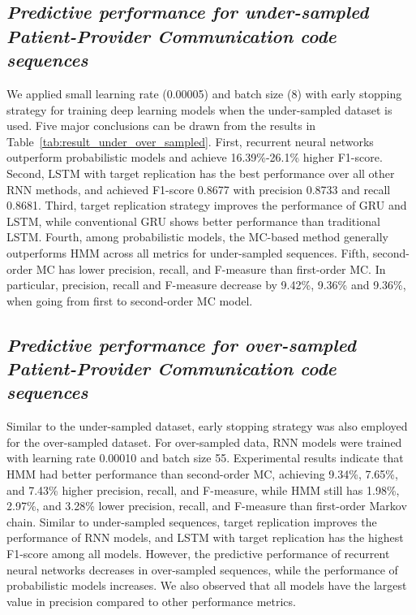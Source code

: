 \documentclass{amia_summit_2018}
\begin{document}
\subsection*{\textit{Predictive performance for under-sampled Patient-Provider Communication code sequences}}
We applied small learning rate (0.00005) and batch size (8) with early stopping strategy for training deep learning models when the under-sampled dataset is used. Five major conclusions can be drawn
from the results in Table~\ref{tab:result_under_over_sampled}. First, recurrent neural networks outperform probabilistic models and achieve 16.39\%-26.1\% higher F1-score. Second, LSTM with
target replication has the best performance over all other RNN methods, and achieved F1-score 0.8677 with precision 0.8733 and recall 0.8681. Third, target replication strategy improves the
performance of GRU and LSTM, while conventional GRU shows better performance than traditional LSTM. Fourth, among probabilistic models, the MC-based method generally outperforms HMM across all metrics
for under-sampled sequences. Fifth, second-order MC has lower precision, recall, and F-measure than first-order MC. In particular, precision, recall and F-measure decrease by 9.42\%, 9.36\% and 
9.36\%, when going from first to second-order MC model.

\subsection*{\textit{Predictive performance for over-sampled Patient-Provider Communication code sequences}}
Similar to the under-sampled dataset, early stopping strategy was also employed for the over-sampled dataset. For over-sampled data, RNN models were trained with learning rate 0.00010 and batch size
55. Experimental results indicate that HMM had better performance than second-order MC, achieving 9.34\%, 7.65\%, and 7.43\% higher precision, recall, and F-measure, while HMM still has 1.98\%,
2.97\%, and 3.28\% lower precision, recall, and F-measure than first-order Markov chain. Similar to under-sampled sequences, target replication improves the performance of RNN models, and LSTM with
target replication has the highest F1-score among all models. However, the predictive performance of recurrent neural networks decreases in over-sampled sequences, while the performance of
probabilistic models increases. We also observed that all models have the largest value in precision compared to other performance metrics.
\end{document}
